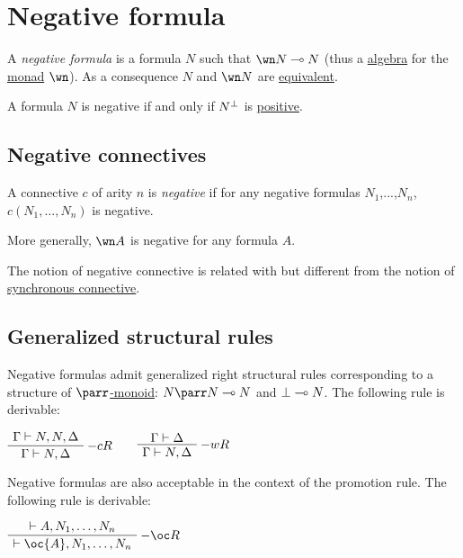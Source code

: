 \section{Negative formula}\label{negative-formula}

A \emph{negative formula} is a formula \(N\) such that \(\wn N\limp N\)
(thus a \href{Wikipedia:F-algebra}{algebra} for the
\href{Wikipedia:Monad_(category_theory)}{monad} \(\wn\)). As a
consequence \(N\) and \(\wn N\) are
\href{Sequent_calculus\#Equivalences}{equivalent}.

A formula \(N\) is negative if and only if \(N^\bot\) is
\href{Positive_formula}{positive}.

\subsection{Negative connectives}\label{negative-connectives}

A connective \(c\) of arity \(n\) is \emph{negative} if for any negative
formulas \(N_1\),...,\(N_n\), \(c(N_1,\dots,N_n)\) is negative.

More generally, \(\wn A\) is negative for any formula \(A\).

The notion of negative connective is related with but different from the
notion of \href{synchronous_connective}{synchronous connective}.

\subsection{Generalized structural
rules}\label{generalized-structural-rules}

Negative formulas admit generalized right structural rules corresponding
to a structure of
\href{Wikipedia:Monoid_(category_theory)}{\(\parr\)-monoid}:
\(N\parr N\limp N\) and \(\bot\multimap N\). The following rule is
derivable:

\(\AxRule{\Gamma\vdash N,N,\Delta}
\LabelRule{- c R}
\UnaRule{\Gamma\vdash N,\Delta}
\DisplayProof
\qquad
\AxRule{\Gamma\vdash\Delta}
\LabelRule{- w R}
\UnaRule{\Gamma\vdash N,\Delta}
\DisplayProof\)

Negative formulas are also acceptable in the context of the promotion
rule. The following rule is derivable:

\(\AxRule{\vdash A,N_1,\dots,N_n}
\LabelRule{- \oc R}
\UnaRule{\vdash \oc{A},N_1,\dots,N_n}
\DisplayProof\)


